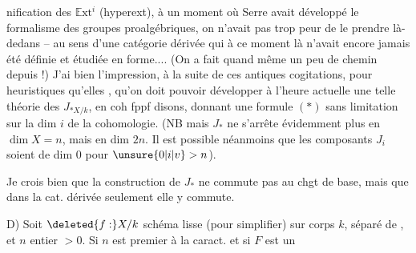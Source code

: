 %
nification des $\mathbb{E}\mathrm{xt}^{i}$ (hyperext), à un moment où Serre avait développé le formalisme des groupes proalgébriques, on n'avait pas trop peur de le prendre là-dedans -- au sens d'une catégorie dérivée qui à ce moment là n'avait encore jamais été définie et étudiée en forme.... (On a fait quand même un peu de chemin depuis !) J'ai bien l'impression, à la suite de ces antiques cogitations, pour heuristiques qu'elles , qu'on doit pouvoir développer à l'heure actuelle une telle théorie des $J_{*X/k}$, en coh fppf disons, donnant une formule $(*)$ sans limitation sur la dim $i$ de la cohomologie. (NB mais $J_*$ ne s'arrête évidemment plus en $\dim X=n$, mais en dim $2n$. Il est possible néanmoins que les composants $J_i$ soient de dim $0$ pour $\unsure{0|i|v}>n$).

Je crois bien que la construction de $J_*$ ne commute pas au chgt de base, mais que dans la cat. dérivée seulement elle y commute.

D) Soit $\deleted{f:}X/k$ schéma lisse  (pour simplifier) sur corps $k$, séparé de ,  et $n$ entier $>0$. Si $n$ est premier à la caract. et si $F$ est un
